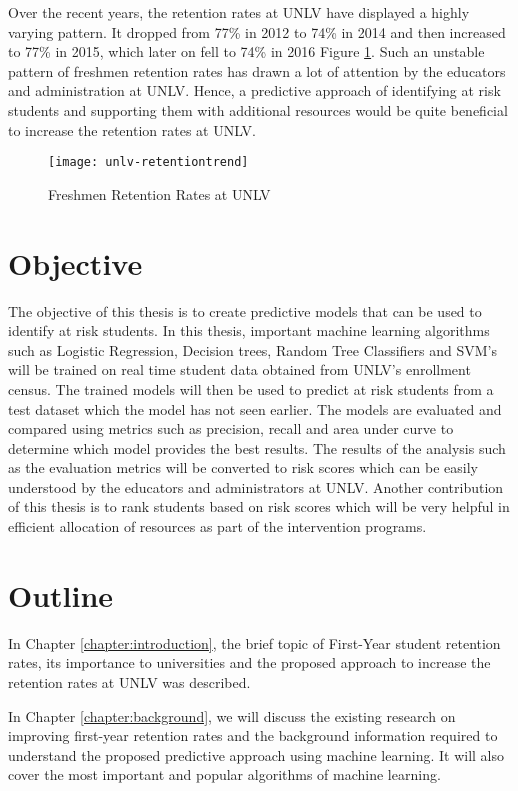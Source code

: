 \documentclass[11pt,openright]{report}
\begin{document}
Over the recent years, the retention rates at UNLV have displayed a highly varying pattern. It dropped from 77\% in 2012 to 74\% in 2014 and then increased to 77\% in 2015, which later on fell to 74\% in 2016 Figure \ref{fig:unlv_retention_trend}. Such an unstable pattern of freshmen retention rates has drawn a lot of attention by the educators and administration at UNLV. Hence, a predictive approach of identifying at risk students and supporting them with additional resources would be quite beneficial to increase the retention rates at UNLV. 
\begin{figure}
	\centering
	\texttt{[image: unlv-retentiontrend]}
	\caption{Freshmen Retention Rates at UNLV}
	\label{fig:unlv_retention_trend}
\end{figure}

\section{Objective}\label{section:objective}
The objective of this thesis is to create predictive models that can be used to identify at risk students. In this thesis, important machine learning algorithms such as Logistic Regression, Decision trees, Random Tree Classifiers and  SVM's will be trained on real time student data obtained from UNLV's enrollment census. The trained models will then be used to predict at risk students from a test dataset which the model has not seen earlier. The models are evaluated and compared using metrics such as precision, recall and area under curve to determine which model provides the best results. The results of the analysis such as the evaluation metrics will be converted to risk scores which can be easily understood by the educators and administrators at UNLV. Another contribution of this thesis is to rank students based on risk scores which will be very helpful in efficient allocation of resources as part of the intervention programs.

\section{Outline}\label{section:outline}

In Chapter \ref{chapter:introduction}, the brief topic of First-Year student retention rates, its importance to universities and the proposed approach to increase the retention rates at UNLV was described.\newline

\noindent In Chapter \ref{chapter:background}, we will discuss the existing research on improving first-year retention rates and the background information required to understand the proposed predictive approach using machine learning. It will also cover the most important and popular algorithms of machine learning.
\newline
\end{document}
